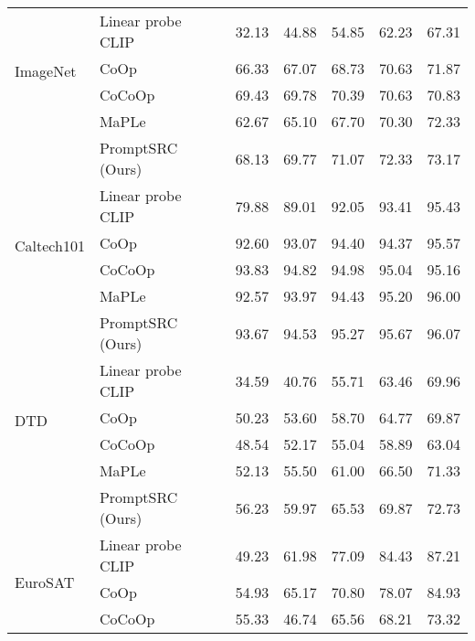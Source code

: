 \documentclass[10pt,twocolumn,letterpaper]{article}
\begin{document}
\begin{center}
\begin{table*}[t!]
{\begin{tabular}{ll|ccccc}
\multirow{4}{*}{ImageNet}      & Linear probe CLIP      &32.13	&44.88&	54.85	&62.23	&67.31\\ 
                               & CoOp                   &66.33	&67.07	&68.73	&70.63&	71.87\\ 
                               & CoCoOp                  & 69.43	&69.78	&70.39&	70.63&	70.83\\
                                                              & MaPLe                  & 62.67	&65.10	&67.70&	70.30&	72.33\\
                             \rowcolor{tabhighlight}   &  PromptSRC (Ours)              & 68.13	&69.77	&71.07	&72.33	&73.17\\
\midrule
\multirow{4}{*}{Caltech101}    & Linear probe CLIP      & 79.88	&89.01	&92.05	&93.41	&95.43\\
                               & CoOp                    & 92.60	&93.07	&94.40	&94.37	&95.57\\
                               & CoCoOp                  & 93.83	&94.82	&94.98	&95.04	&95.16\\
                                                              & MaPLe                  & 92.57	&93.97	&94.43&	95.20&	96.00\\
                               \rowcolor{tabhighlight} &  PromptSRC (Ours)                 &93.67	&94.53	&95.27	&95.67	&96.07\\
                               \midrule
\multirow{4}{*}{DTD}           & Linear probe CLIP       & 34.59	&40.76	&55.71	&63.46	&69.96\\
                               & CoOp                   &50.23&	53.60	&58.70	&64.77	&69.87\\
                               & CoCoOp                      & 48.54	&52.17	&55.04	&58.89	&63.04\\
                                                              & MaPLe                  & 52.13	&55.50	&61.00&	66.50&	71.33\\
                               \rowcolor{tabhighlight} &  PromptSRC  (Ours)                & 56.23&59.97	&65.53	&69.87	&72.73\\
                               \midrule
\multirow{4}{*}{EuroSAT}       & Linear probe CLIP       &49.23	&61.98	&77.09&	84.43	&87.21\\
                               & CoOp                   &54.93	&65.17	&70.80	&78.07	&84.93\\
                               & CoCoOp                  & 55.33	&46.74	&65.56&	68.21	&73.32\\

\end{tabular}}
\end{table*}
\end{center}
\end{document}
